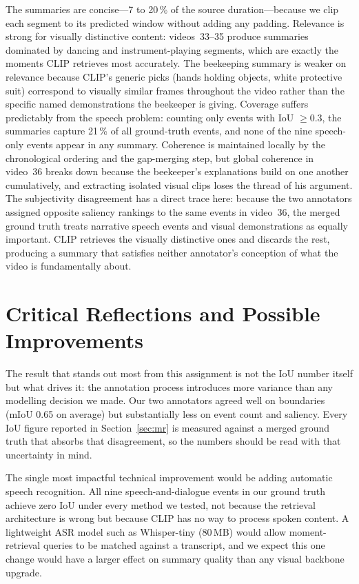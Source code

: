 \documentclass[sigconf, nonacm]{acmart}
\begin{document}
The summaries are concise---7 to 20\,\% of the source duration---because
we clip each segment to its predicted window without adding any padding.
Relevance is strong for visually distinctive content: videos~33--35
produce summaries dominated by dancing and instrument-playing segments,
which are exactly the moments CLIP retrieves most accurately. The
beekeeping summary is weaker on relevance because CLIP's generic picks
(hands holding objects, white protective suit) correspond to visually
similar frames throughout the video rather than the specific named
demonstrations the beekeeper is giving. Coverage suffers predictably from
the speech problem: counting only events with IoU $\geq 0.3$, the summaries
capture 21\,\% of all ground-truth events, and none of the nine
speech-only events appear in any summary. Coherence is maintained locally
by the chronological ordering and the gap-merging step, but global
coherence in video~36 breaks down because the beekeeper's explanations
build on one another cumulatively, and extracting isolated visual clips
loses the thread of his argument. The subjectivity disagreement has a
direct trace here: because the two annotators assigned opposite saliency
rankings to the same events in video~36, the merged ground truth treats
narrative speech events and visual demonstrations as equally important.
CLIP retrieves the visually distinctive ones and discards the rest,
producing a summary that satisfies neither annotator's conception of
what the video is fundamentally about.

\section{Critical Reflections and Possible Improvements}

The result that stands out most from this assignment is not the IoU number
itself but what drives it: the annotation process introduces more variance
than any modelling decision we made. Our two annotators agreed well on
boundaries (mIoU 0.65 on average) but substantially less on event count
and saliency. Every IoU figure reported in Section~\ref{sec:mr} is measured
against a merged ground truth that absorbs that disagreement, so the numbers
should be read with that uncertainty in mind.

The single most impactful technical improvement would be adding automatic
speech recognition. All nine speech-and-dialogue events in our ground truth
achieve zero IoU under every method we tested, not because the retrieval
architecture is wrong but because CLIP has no way to process spoken
content. A lightweight ASR model such as Whisper-tiny (80\,MB) would
allow moment-retrieval queries to be matched against a transcript, and we
expect this one change would have a larger effect on summary quality than
any visual backbone upgrade.
\end{document}
